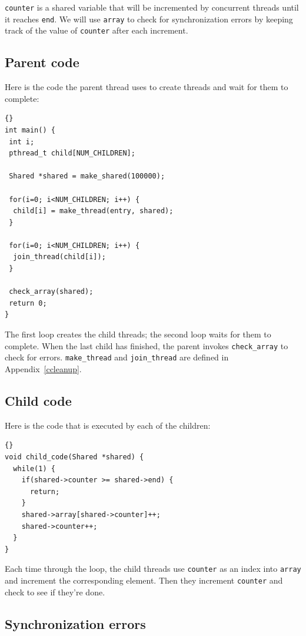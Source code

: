 \documentclass{book}
\begin{document}
{\tt counter} is a shared variable that will be incremented by
concurrent threads until it reaches {\tt end}.  We will use
    {\tt array} to check for synchronization errors by keeping track
of the value of {\tt counter} after each increment.

\subsection{Parent code}

Here is the code the parent thread uses to create threads
and wait for them to complete:

\begin{lstlisting}[title={}]{}
int main() {
 int i;
 pthread_t child[NUM_CHILDREN];

 Shared *shared = make_shared(100000);

 for(i=0; i<NUM_CHILDREN; i++) {
  child[i] = make_thread(entry, shared);
 }

 for(i=0; i<NUM_CHILDREN; i++) {
  join_thread(child[i]);
 }

 check_array(shared);
 return 0;
}
\end{lstlisting}

The first loop creates the child threads; the second loop waits
for them to complete.  When the last child has finished, the parent
invokes {\tt check\_array} to check for errors.
    {\tt make\_thread} and {\tt join\_thread} are defined in
Appendix~\ref{ccleanup}.

\subsection{Child code}

Here is the code that is executed by each of the children:

\begin{lstlisting}[title={}]{}
void child_code(Shared *shared) {
  while(1) {
    if(shared->counter >= shared->end) {
      return;
    }
    shared->array[shared->counter]++;
    shared->counter++;
  }
}
\end{lstlisting}

Each time through the loop, the child threads use {\tt counter}
as an index into {\tt array} and increment the corresponding element.
Then they increment {\tt counter} and check to see if they're done.

\subsection{Synchronization errors}
\end{document}
